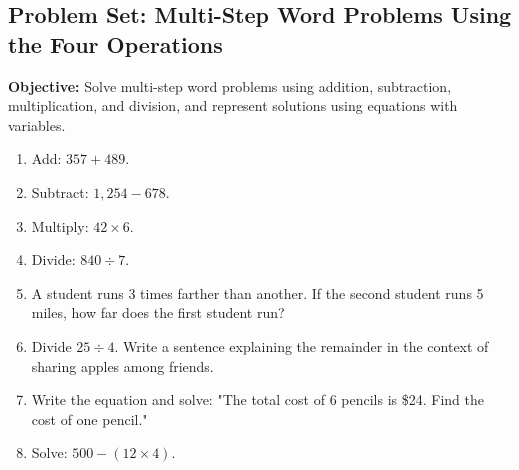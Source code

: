 \documentclass[12pt]{article}
\title{}
\date{}
\begin{document}
\subsection*{Problem Set: Multi-Step Word Problems Using the Four Operations}
\onehalfspacing

\begin{tcolorbox}[colframe=black!40, colback=gray!5, 
coltitle=black, colbacktitle=black!20, fonttitle=\bfseries\Large, 
title=Learning Objective, halign title=center, left=5pt, right=5pt, top=5pt, bottom=15pt]
\textbf{Objective:} Solve multi-step word problems using addition, subtraction, multiplication, and division, and represent solutions using equations with variables.
\end{tcolorbox}

\begin{tcolorbox}[colframe=black!60, colback=white, 
coltitle=black, colbacktitle=black!15, fonttitle=\bfseries\Large, 
title=Exercises, halign title=center, left=10pt, right=10pt, top=10pt, bottom=30pt]
\begin{enumerate}[itemsep=3em]
    \item Add: \( 357 + 489 \).
    \item Subtract: \( 1,254 - 678 \).
    \item Multiply: \( 42 \times 6 \).
    \item Divide: \( 840 \div 7 \).
    \item A student runs 3 times farther than another. If the second student runs 5 miles, how far does the first student run?
    \item Divide \( 25 \div 4 \). Write a sentence explaining the remainder in the context of sharing apples among friends.
    \item Write the equation and solve: "The total cost of 6 pencils is \$24. Find the cost of one pencil."
    \item Solve: \( 500 - (12 \times 4) \).
\end{enumerate}
\end{tcolorbox}

\vspace{1em}
\end{document}
